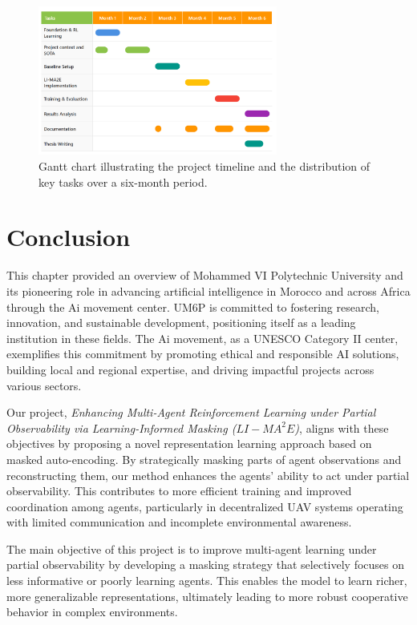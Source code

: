 \begin{figure}[H]
    \centering
    \includegraphics[width=0.7\textwidth]{images_pfe/gant.png}
    \caption{Gantt chart illustrating the project timeline and the distribution of key tasks over a six-month period.}
    \label{fig:gantt}
\end{figure}
\section*{Conclusion}
This chapter provided an overview of Mohammed VI Polytechnic University and its pioneering role in advancing artificial intelligence in Morocco and across Africa through the Ai movement center. UM6P is committed to fostering research, innovation, and sustainable development, positioning itself as a leading institution in these fields. The Ai movement, as a UNESCO Category II center, exemplifies this commitment by promoting ethical and responsible AI solutions, building local and regional expertise, and driving impactful projects across various sectors.

Our project, \textit{Enhancing Multi-Agent Reinforcement Learning under
Partial Observability via Learning-Informed Masking ($LI-MA^{2}E$)}, aligns with these objectives by proposing a novel representation learning approach based on masked auto-encoding. By strategically masking parts of agent observations and reconstructing them, our method enhances the agents' ability to act under partial observability. This contributes to more efficient training and improved coordination among agents, particularly in decentralized UAV systems operating with limited communication and incomplete environmental awareness.

The main objective of this project is to improve multi-agent learning under partial observability by developing a masking strategy that selectively focuses on less informative or poorly learning agents. This enables the model to learn richer, more generalizable representations, ultimately leading to more robust cooperative behavior in complex environments.


